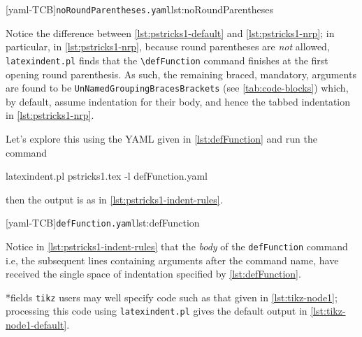 	\begin{minipage}{.45\textwidth}
	\end{minipage}
	\hfill
	\begin{minipage}{.45\textwidth}
		[yaml-TCB]{\texttt{noRoundParentheses.yaml}}{lst:noRoundParentheses}
	\end{minipage}

	Notice the difference between \cref{lst:pstricks1-default} and \cref{lst:pstricks1-nrp}; in particular, in \cref{lst:pstricks1-nrp}, because
	round parentheses are \emph{not} allowed, \texttt{latexindent.pl} finds that the \lstinline!\defFunction! command finishes at the first opening
	round parenthesis. As such, the remaining braced, mandatory, arguments are found to be \texttt{UnNamedGroupingBracesBrackets} (see \vref{tab:code-blocks})
	which, by default, assume indentation for their body, and hence the tabbed indentation in \cref{lst:pstricks1-nrp}.

	Let's explore this using the YAML given in \cref{lst:defFunction} and run the command
	\begin{commandshell}
latexindent.pl pstricks1.tex -l defFunction.yaml
        \end{commandshell}
	then the output is as in \cref{lst:pstricks1-indent-rules}.

	\begin{minipage}{.45\textwidth}
	\end{minipage}
	\hfill
	\begin{minipage}{.45\textwidth}
		[yaml-TCB]{\texttt{defFunction.yaml}}{lst:defFunction}
	\end{minipage}

	Notice in \cref{lst:pstricks1-indent-rules} that the \emph{body} of the \lstinline!defFunction! command i.e, the subsequent lines
	containing arguments after the command name, have received the single space of indentation specified by \cref{lst:defFunction}.

*{fields}
	\texttt{tikz} users may well specify code such as that given in \cref{lst:tikz-node1}; processing this code using
	\texttt{latexindent.pl} gives the default output in \cref{lst:tikz-node1-default}.

